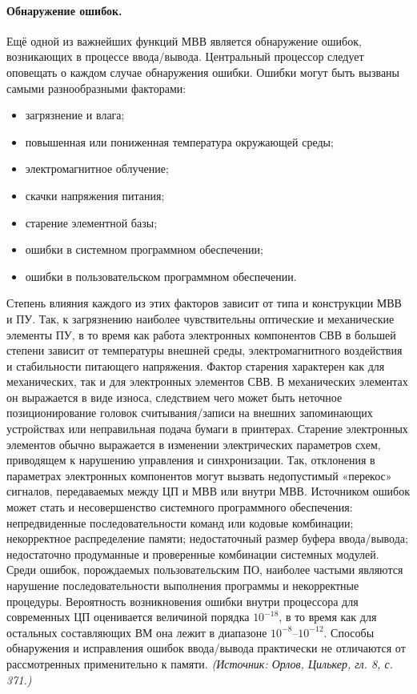 \documentclass[a4paper,12pt]{article}
\begin{document}
\paragraph{Обнаружение ошибок.}
Ещё одной из важнейших функций МВВ является обнаружение ошибок, возникающих в процессе ввода/вывода. Центральный процессор следует оповещать о каждом случае обнаружения ошибки. Ошибки могут быть вызваны самыми разнообразными факторами:
\begin{itemize}
\item загрязнение и влага;
\item повышенная или пониженная температура окружающей среды;
\item электромагнитное облучение;
\item скачки напряжения питания;
\item старение элементной базы;
\item ошибки в системном программном обеспечении;
\item ошибки в пользовательском программном обеспечении.
\end{itemize}
Степень влияния каждого из этих факторов зависит от типа и конструкции МВВ и ПУ. Так, к загрязнению наиболее чувствительны оптические и механические элементы ПУ, в то время как работа электронных компонентов СВВ в большей степени зависит от температуры внешней среды, электромагнитного воздействия и стабильности питающего напряжения. Фактор старения характерен как для механических, так и для электронных элементов СВВ. В механических элементах он выражается в виде износа, следствием чего может быть неточное позиционирование головок считывания/записи на внешних запоминающих устройствах или неправильная подача бумаги в принтерах. Старение электронных элементов обычно выражается в изменении электрических параметров схем, приводящем к нарушению управления и синхронизации. Так, отклонения в параметрах электронных компонентов могут вызвать недопустимый «перекос» сигналов, передаваемых между ЦП и МВВ или внутри МВВ. Источником ошибок может стать и несовершенство системного программного обеспечения: непредвиденные последовательности команд или кодовые комбинации; некорректное распределение памяти; недостаточный размер буфера ввода/вывода; недостаточно продуманные и проверенные комбинации системных модулей. Среди ошибок, порождаемых пользовательским ПО, наиболее частыми являются нарушение последовательности выполнения программы и некорректные процедуры. Вероятность возникновения ошибки внутри процессора для современных ЦП оценивается величиной порядка \(10^{-18}\), в то время как для остальных составляющих ВМ она лежит в диапазоне \(10^{-8}\)--\(10^{-12}\). Способы обнаружения и исправления ошибок ввода/вывода практически не отличаются от рассмотренных применительно к памяти.
\textit{(Источник: Орлов, Цилькер, гл. 8, с. 371.)}
\end{document}
